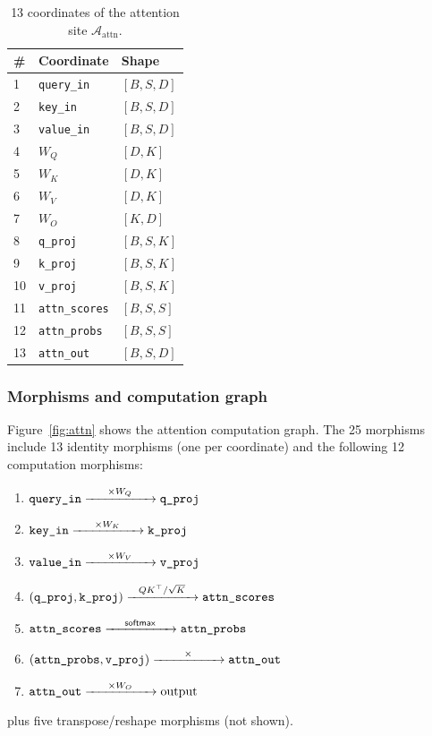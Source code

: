 \documentclass[11pt]{article}
\newcommand{\TSoftmax}{\mathsf{softmax}}           %
\newcommand{\AttnSite}{\mathcal{A}_{\mathrm{attn}}}%
\begin{document}
\begin{table}[H]
\centering
\caption{13 coordinates of the attention site $\AttnSite$.}
\label{tab:attn-coords}
\begin{tabular}{@{}lll@{}}
\toprule
\textbf{\#} & \textbf{Coordinate} & \textbf{Shape} \\
\midrule
1 & \texttt{query\_in}   & $[B,S,D]$ \\
2 & \texttt{key\_in}     & $[B,S,D]$ \\
3 & \texttt{value\_in}   & $[B,S,D]$ \\
4 & $W_Q$               & $[D,K]$ \\
5 & $W_K$               & $[D,K]$ \\
6 & $W_V$               & $[D,K]$ \\
7 & $W_O$               & $[K,D]$ \\
8 & \texttt{q\_proj}     & $[B,S,K]$ \\
9 & \texttt{k\_proj}     & $[B,S,K]$ \\
10 & \texttt{v\_proj}   & $[B,S,K]$ \\
11 & \texttt{attn\_scores} & $[B,S,S]$ \\
12 & \texttt{attn\_probs}  & $[B,S,S]$ \\
13 & \texttt{attn\_out}  & $[B,S,D]$ \\
\bottomrule
\end{tabular}
\end{table}

\subsubsection{Morphisms and computation graph}

Figure~\ref{fig:attn} shows the attention computation graph.
The 25 morphisms include 13 identity morphisms (one per coordinate)
and the following 12 computation morphisms:

\begin{enumerate}[leftmargin=*]
\item $\texttt{query\_in} \xrightarrow{\mathmakebox[1.8cm]{\times W_Q}} \texttt{q\_proj}$
\item $\texttt{key\_in} \xrightarrow{\mathmakebox[1.8cm]{\times W_K}} \texttt{k\_proj}$
\item $\texttt{value\_in} \xrightarrow{\mathmakebox[1.8cm]{\times W_V}} \texttt{v\_proj}$
\item $(\texttt{q\_proj}, \texttt{k\_proj}) \xrightarrow{\mathmakebox[1.8cm]{QK^\top/\sqrt{K}}} \texttt{attn\_scores}$
\item $\texttt{attn\_scores} \xrightarrow{\mathmakebox[1.8cm]{\TSoftmax}} \texttt{attn\_probs}$
\item $(\texttt{attn\_probs}, \texttt{v\_proj}) \xrightarrow{\mathmakebox[1.8cm]{\times}} \texttt{attn\_out}$
\item $\texttt{attn\_out} \xrightarrow{\mathmakebox[1.8cm]{\times W_O}} \text{output}$
\end{enumerate}
plus five transpose/reshape morphisms (not shown).
\end{document}
